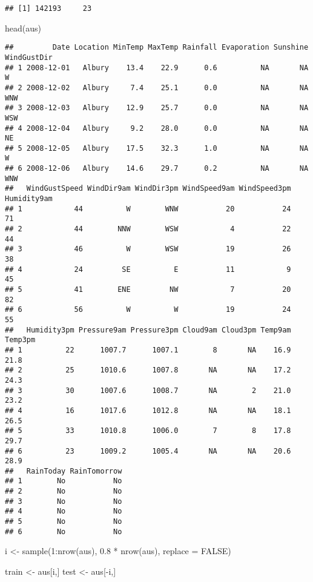 \documentclass[
]{article}
\newenvironment{Shaded}{\begin{snugshade}}{\end{snugshade}}
\newcommand{\AttributeTok}[1]{\textcolor[rgb]{0.77,0.63,0.00}{#1}}
\newcommand{\ConstantTok}[1]{\textcolor[rgb]{0.00,0.00,0.00}{#1}}
\newcommand{\DecValTok}[1]{\textcolor[rgb]{0.00,0.00,0.81}{#1}}
\newcommand{\FloatTok}[1]{\textcolor[rgb]{0.00,0.00,0.81}{#1}}
\newcommand{\FunctionTok}[1]{\textcolor[rgb]{0.00,0.00,0.00}{#1}}
\newcommand{\NormalTok}[1]{#1}
\newcommand{\OtherTok}[1]{\textcolor[rgb]{0.56,0.35,0.01}{#1}}
\newcommand{\SpecialCharTok}[1]{\textcolor[rgb]{0.00,0.00,0.00}{#1}}
\begin{document}
\begin{verbatim}
## [1] 142193     23
\end{verbatim}

\begin{Shaded}
\begin{Highlighting}[]
\FunctionTok{head}\NormalTok{(aus)}
\end{Highlighting}
\end{Shaded}

\begin{verbatim}
##         Date Location MinTemp MaxTemp Rainfall Evaporation Sunshine WindGustDir
## 1 2008-12-01   Albury    13.4    22.9      0.6          NA       NA           W
## 2 2008-12-02   Albury     7.4    25.1      0.0          NA       NA         WNW
## 3 2008-12-03   Albury    12.9    25.7      0.0          NA       NA         WSW
## 4 2008-12-04   Albury     9.2    28.0      0.0          NA       NA          NE
## 5 2008-12-05   Albury    17.5    32.3      1.0          NA       NA           W
## 6 2008-12-06   Albury    14.6    29.7      0.2          NA       NA         WNW
##   WindGustSpeed WindDir9am WindDir3pm WindSpeed9am WindSpeed3pm Humidity9am
## 1            44          W        WNW           20           24          71
## 2            44        NNW        WSW            4           22          44
## 3            46          W        WSW           19           26          38
## 4            24         SE          E           11            9          45
## 5            41        ENE         NW            7           20          82
## 6            56          W          W           19           24          55
##   Humidity3pm Pressure9am Pressure3pm Cloud9am Cloud3pm Temp9am Temp3pm
## 1          22      1007.7      1007.1        8       NA    16.9    21.8
## 2          25      1010.6      1007.8       NA       NA    17.2    24.3
## 3          30      1007.6      1008.7       NA        2    21.0    23.2
## 4          16      1017.6      1012.8       NA       NA    18.1    26.5
## 5          33      1010.8      1006.0        7        8    17.8    29.7
## 6          23      1009.2      1005.4       NA       NA    20.6    28.9
##   RainToday RainTomorrow
## 1        No           No
## 2        No           No
## 3        No           No
## 4        No           No
## 5        No           No
## 6        No           No
\end{verbatim}

\begin{Shaded}
\begin{Highlighting}[]
\NormalTok{i }\OtherTok{\textless{}{-}} \FunctionTok{sample}\NormalTok{(}\DecValTok{1}\SpecialCharTok{:}\FunctionTok{nrow}\NormalTok{(aus), }\FloatTok{0.8} \SpecialCharTok{*} \FunctionTok{nrow}\NormalTok{(aus), }\AttributeTok{replace =} \ConstantTok{FALSE}\NormalTok{)}

\NormalTok{train }\OtherTok{\textless{}{-}}\NormalTok{ aus[i,]}
\NormalTok{test }\OtherTok{\textless{}{-}}\NormalTok{ aus[}\SpecialCharTok{{-}}\NormalTok{i,]}
\end{Highlighting}
\end{Shaded}
\end{document}
